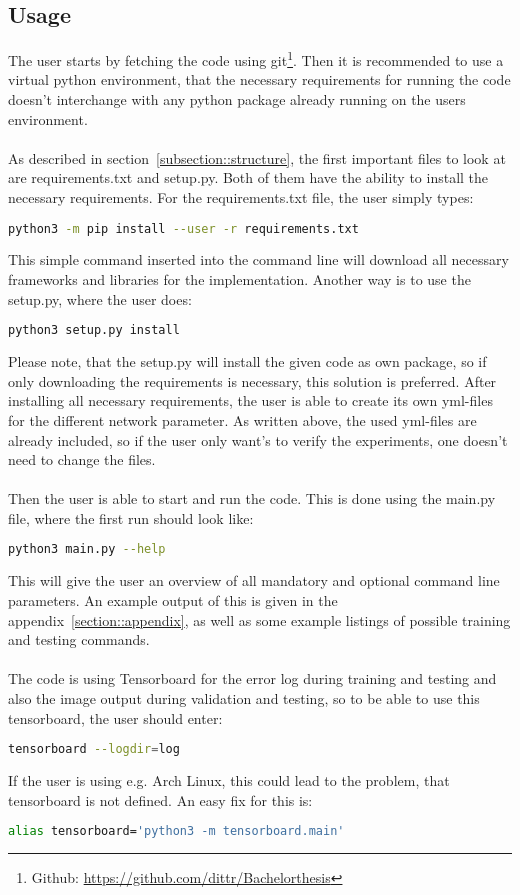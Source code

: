  \subsection{Usage}
  The user starts by fetching the code using git\footnote{Github: \href{https://github.com/dittr/Bachelorthesis}{https://github.com/dittr/Bachelorthesis}}.
  Then it is recommended to use a virtual python environment, that the necessary requirements for running the code doesn't interchange with any python package
  already running on the users environment.
  \\\\
  As described in section~\ref{subsection::structure}, the first important files to look at are requirements.txt and setup.py. Both of them have the ability to
  install the necessary requirements. For the requirements.txt file, the user simply types:
  \begin{lstlisting}[language=bash]
   python3 -m pip install --user -r requirements.txt
  \end{lstlisting}\noindent
  This simple command inserted into the command line will download all necessary frameworks and libraries for the implementation.
  Another way is to use the setup.py, where the user does:
  \begin{lstlisting}[language=bash]
   python3 setup.py install
  \end{lstlisting}\noindent
  Please note, that the setup.py will install the given code as own package, so if only downloading the requirements is necessary, this solution is preferred.
  After installing all necessary requirements, the user is able to create its own yml-files for the different network parameter.
  As written above, the used yml-files are already included, so if the user only want's to verify the experiments, one doesn't need to change the files.
  \\\\
  Then the user is able to start and run the code.
  This is done using the main.py file, where the first run should look like:
  \begin{lstlisting}[language=bash]
   python3 main.py --help
  \end{lstlisting}\noindent
  This will give the user an overview of all mandatory and optional command line parameters. An example output of this is given in the 
  appendix~\ref{section::appendix}, as well as some example listings of possible training and testing commands.
  \\\\
  The code is using Tensorboard for the error log during training and testing and also the image output during validation and testing, so to be able to use
  this tensorboard, the user should enter:
  \begin{lstlisting}[language=bash]
   tensorboard --logdir=log
  \end{lstlisting}\noindent
  If the user is using e.g. Arch Linux, this could lead to the problem, that tensorboard is not defined. An easy fix for this is:
  \begin{lstlisting}[language=bash]
   alias tensorboard='python3 -m tensorboard.main'
  \end{lstlisting}\noindent